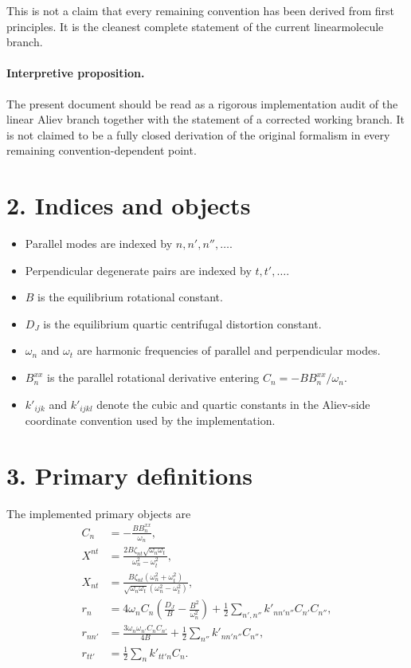 \documentclass[11pt]{article}
\begin{document}
This is not a claim that every remaining convention has been derived from first
principles. It is the cleanest complete statement of the current linearmolecule
branch.

\paragraph{Interpretive proposition.}
The present document should be read as a rigorous implementation audit of the
linear Aliev branch together with the statement of a corrected working branch.
It is not claimed to be a fully closed derivation of the original formalism in
every remaining convention-dependent point.

\section*{2. Indices and objects}

\begin{itemize}
\item Parallel modes are indexed by $n,n',n'',\dots$.
\item Perpendicular degenerate pairs are indexed by $t,t',\dots$.
\item $B$ is the equilibrium rotational constant.
\item $D_J$ is the equilibrium quartic centrifugal distortion constant.
\item $\omega_n$ and $\omega_t$ are harmonic frequencies of parallel and
perpendicular modes.
\item $B_n^{xx}$ is the parallel rotational derivative entering
$C_n = -B B_n^{xx}/\omega_n$.
\item $k'_{ijk}$ and $k'_{ijkl}$ denote the cubic and quartic constants in the
Aliev-side coordinate convention used by the implementation.
\end{itemize}

\section*{3. Primary definitions}

The implemented primary objects are
\begin{align}
C_n &= - \frac{B B_n^{xx}}{\omega_n},
\\[0.4em]
X^{nt} &= \frac{2B\zeta_{nt}\sqrt{\omega_n\omega_t}}{\omega_n^2-\omega_t^2},
\\[0.4em]
X_{nt} &= \frac{B\zeta_{nt}(\omega_n^2+\omega_t^2)}
{\sqrt{\omega_n\omega_t}(\omega_n^2-\omega_t^2)},
\\[0.4em]
r_n &= 4\omega_n C_n\left(\frac{D_J}{B}-\frac{B^2}{\omega_n^2}\right)
+ \frac{1}{2}\sum_{n',n''} k'_{nn'n''} C_{n'} C_{n''},
\\[0.4em]
r_{nn'} &= \frac{3\omega_n\omega_{n'} C_n C_{n'}}{4B}
+ \frac{1}{2}\sum_{n''} k'_{nn'n''} C_{n''},
\\[0.4em]
r_{tt'} &= \frac{1}{2}\sum_n k'_{tt'n} C_n.
\end{align}
\end{document}
